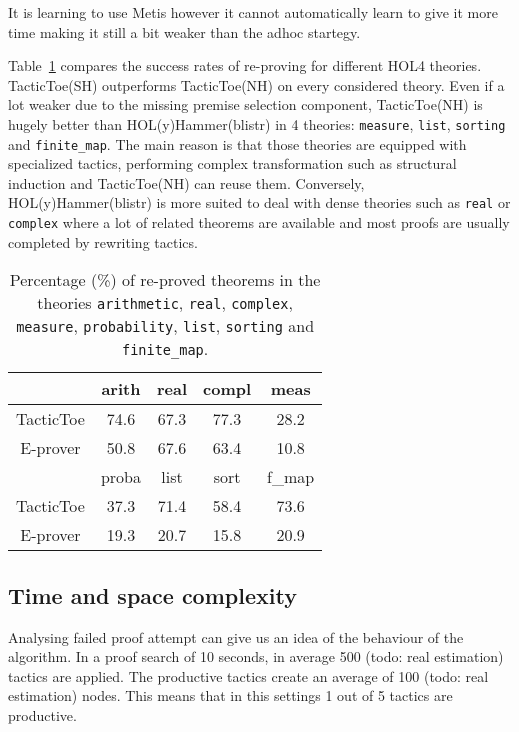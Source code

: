 \documentclass[runningheads,a4paper,draft]{svjour3}
\def\holfour{\textsf{HOL4}\xspace}
\def\eprover{\textsf{E-prover}\xspace}
\def\holyhammer{\textsf{HOL(y)Hammer}\xspace}
\def\metis{\textsf{Metis}\xspace}
\def\tactictoe{\textsf{TacticToe}\xspace}
\begin{document}
It is learning to use \metis however it cannot automatically learn to give it 
more time making it still a bit weaker than the adhoc startegy.



Table~\ref{theories} compares the success rates of re-proving for different
\holfour theories. \tactictoe(SH) outperforms \tactictoe(NH) on every 
considered theory.
Even if a lot weaker due to the missing premise selection component, 
\tactictoe(NH)
is hugely better than \holyhammer(blistr) in 4 theories: \texttt{measure}, 
\texttt{list}, \texttt{sorting} and \texttt{finite\_map}. The main reason is 
that 
those theories are equipped with specialized tactics, performing complex 
transformation such as structural induction and \tactictoe(NH) can reuse them. 
Conversely, \holyhammer(blistr) is more suited to deal with dense theories such 
as 
\texttt{real} or \texttt{complex} where a lot of related theorems are available 
and 
most proofs are usually completed by rewriting tactics.

\begin{table}[b!]
\centering
\setlength{\tabcolsep}{3mm}
\begin{tabular}{@{}ccccc@{}}
\toprule
\phantom{ab} & {arith} & {real} & {compl} 
& {meas} \\
\midrule
\tactictoe & 74.6 & 67.3 & 77.3 & 28.2\\
\eprover & 50.8 & 67.6 & 63.4 & 10.8 \\
\midrule
\phantom{abc}  & {proba} & {list} & {sort} & {f\_map} \\
\midrule
\tactictoe & 37.3 & 71.4 & 58.4 & 73.6 \\
\eprover & 19.3 & 20.7 & 15.8 & 20.9 \\
\bottomrule
\end{tabular}
\caption{\label{theories}Percentage (\%) of re-proved theorems in the theories 
\texttt{arithmetic}, \texttt{real}, \texttt{complex}, \texttt{measure},  
\texttt{probability}, \texttt{list}, \texttt{sorting} and \texttt{finite\_map}. 
}
\end{table}  


\subsection{Time and space complexity}

Analysing failed proof attempt can give us an idea of the behaviour of the 
algorithm. In a proof search of 10 seconds, in average 500 (todo: real 
estimation) tactics are applied.
The productive tactics create an average of 100 (todo: real estimation) nodes. 
This means that in this settings 1 out of 5 tactics are productive.
\end{document}
